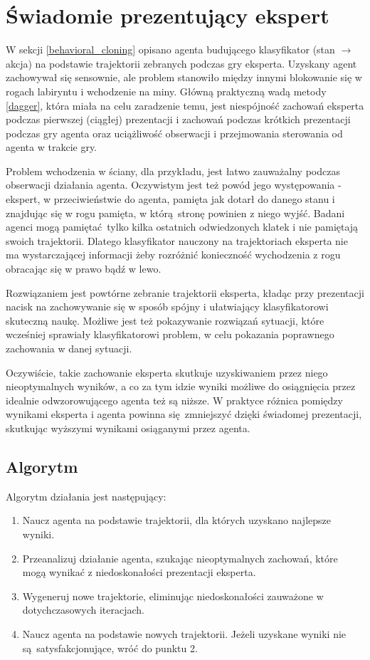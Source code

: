 \section{Świadomie prezentujący ekspert}\label{presenting_expert}
W sekcji \ref{behavioral_cloning} opisano agenta budującego klasyfikator (stan $\to$ akcja) na podstawie trajektorii zebranych podczas gry eksperta. Uzyskany agent zachowywał się sensownie, ale problem stanowiło między innymi blokowanie się w rogach labiryntu i wchodzenie na miny. Główną praktyczną wadą metody \ref{dagger}, która miała na celu zaradzenie temu, jest niespójność zachowań eksperta podczas pierwszej (ciągłej) prezentacji i zachowań podczas krótkich prezentacji podczas gry agenta oraz uciążliwość obserwacji i przejmowania sterowania od agenta w trakcie gry.

Problem wchodzenia w ściany, dla przykładu, jest łatwo zauważalny podczas obserwacji działania agenta. Oczywistym jest też powód jego występowania - ekspert, w przeciwieństwie do agenta, pamięta jak dotarł do danego stanu i znajdując się w rogu pamięta, w którą stronę powinien z niego wyjść. Badani agenci mogą pamiętać tylko kilka ostatnich odwiedzonych klatek i nie pamiętają swoich trajektorii. Dlatego klasyfikator nauczony na trajektoriach eksperta nie ma wystarczającej informacji żeby rozróżnić konieczność wychodzenia z rogu obracając się w prawo bądź w lewo.

Rozwiązaniem jest powtórne zebranie trajektorii eksperta, kładąc przy prezentacji nacisk na zachowywanie się w sposób spójny i ułatwiający klasyfikatorowi skuteczną naukę. Możliwe jest też pokazywanie rozwiązań sytuacji, które wcześniej sprawiały klasyfikatorowi problem, w celu pokazania poprawnego zachowania w danej sytuacji.

Oczywiście, takie zachowanie eksperta skutkuje uzyskiwaniem przez niego nieoptymalnych wyników, a co za tym idzie wyniki możliwe do osiągnięcia przez idealnie odwzorowującego agenta też są niższe. W praktyce różnica pomiędzy wynikami eksperta i agenta powinna się zmniejszyć dzięki świadomej prezentacji, skutkując wyższymi wynikami osiąganymi przez agenta.

\subsection{Algorytm}

Algorytm działania jest następujący:
\begin{enumerate}
\item{Naucz agenta na podstawie trajektorii, dla których uzyskano najlepsze wyniki.}
\item{Przeanalizuj działanie agenta, szukając nieoptymalnych zachowań, które mogą wynikać z niedoskonałości prezentacji eksperta.}
\item{Wygeneruj nowe trajektorie, eliminując niedoskonałości zauważone w dotychczasowych iteracjach. }
\item{Naucz agenta na podstawie nowych trajektorii. Jeżeli uzyskane wyniki nie są satysfakcjonujące, wróć do punktu 2.}
\end{enumerate}

